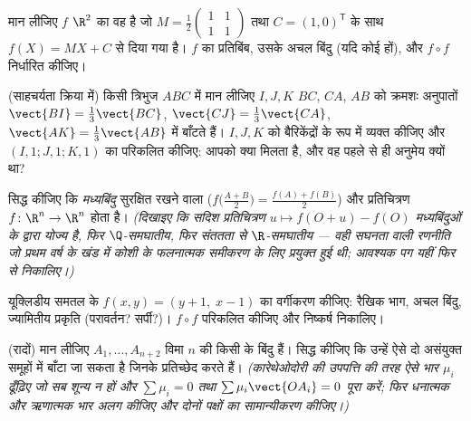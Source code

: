 \begin{exercise}[$\star$]\label{exo:b2:affine:3}
मान लीजिए $f$ $\R^2$ का वह  है जो $M = \frac12\begin{pmatrix} 1 & 1\\ 1 & 1\end{pmatrix}$ तथा $C =
(1, 0)^{\mathsf T}$ के साथ $f(X) = MX + C$ से
दिया गया है। $f$ का प्रतिबिंब, उसके अचल बिंदु (यदि कोई हों), और $f \circ f$
निर्धारित कीजिए।
\end{exercise}

\begin{exercise}[$\star\star$]\label{exo:b2:affine:4}
(साहचर्यता क्रिया में) किसी त्रिभुज $ABC$ में मान लीजिए $I, J, K$ $BC$, $CA$, $AB$
को क्रमशः अनुपातों $\vect{BI} = \frac13\vect{BC}$, $\vect{CJ} = \frac13\vect{CA}$, $\vect{AK} = \frac13\vect{AB}$ में बाँटते हैं। $I, J, K$ को बैरिकेंद्रों के
रूप में व्यक्त कीजिए और $(I,1;J,1;K,1)$ का  परिकलित कीजिए: आपको क्या मिलता
है, और वह पहले से ही अनुमेय क्यों था?
\end{exercise}

\begin{exercise}[$\star\star$]\label{exo:b2:affine:5}
सिद्ध कीजिए कि \emph{मध्यबिंदु} सुरक्षित रखने वाला ($f\bigl(\frac{A+B}{2}\bigr) = \frac{f(A) + f(B)}{2}$) और \emph{}
प्रतिचित्रण $f \colon \R^n \to \R^n$  होता है। \emph{(दिखाइए कि सदिश प्रतिचित्रण $u \mapsto
f(O + u) - f(O)$
मध्यबिंदुओं के द्वारा योज्य है, फिर $\Q$-समघातीय, फिर संततता से
$\R$-समघातीय --- वही सघनता वाली रणनीति जो प्रथम वर्ष के खंड में कोशी के
फलनात्मक समीकरण के लिए प्रयुक्त हुई थी; आवश्यक पग यहीं फिर से निकालिए।)}
\end{exercise}

\begin{exercise}[$\star\star$]\label{exo:b2:affine:6}
यूक्लिडीय समतल के  $f(x, y) = (y + 1,\; x - 1)$ का वर्गीकरण कीजिए: रैखिक भाग, अचल
बिंदु, ज्यामितीय प्रकृति (परावर्तन? सर्पी?)। $f \circ f$ परिकलित कीजिए और निष्कर्ष
निकालिए।
\end{exercise}

\begin{exercise}[$\star\star\star$]\label{exo:b2:affine:7}
(रादों) मान लीजिए $A_1, \dots, A_{n+2}$ विमा $n$ की किसी  के बिंदु हैं। सिद्ध
कीजिए कि उन्हें ऐसे दो असंयुक्त समूहों में बाँटा जा सकता है जिनके  प्रतिच्छेद करते हैं। \emph{(कारेथेओदोरी की उपपत्ति की तरह ऐसे भार $\mu_i$
ढूँढ़िए जो सब शून्य न हों और $\sum\mu_i = 0$ तथा $\sum\mu_i\vect{OA_i} = 0$ पूरा करें; फिर धनात्मक और ऋणात्मक
भार अलग कीजिए और दोनों पक्षों का सामान्यीकरण कीजिए।)}
\end{exercise}

